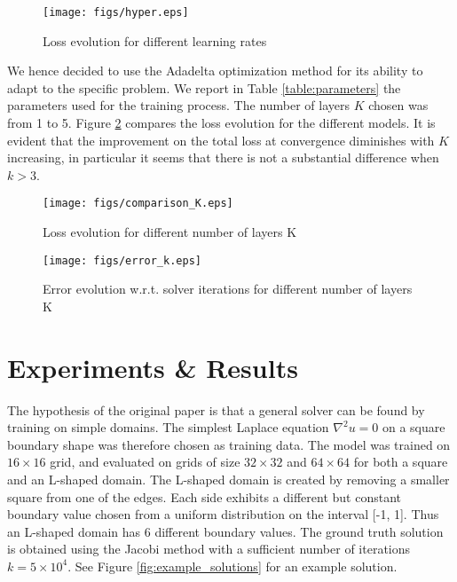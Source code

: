 \documentclass{article} %
\begin{document}


\begin{figure}[h]
\centering
\texttt{[image: figs/hyper.eps]}
\caption{Loss evolution for different learning rates}
\label{fig:hyperparam_learning_rate}
\end{figure}    

We hence decided to use the Adadelta optimization method for its ability to adapt to the specific problem. 
We report in Table \ref{table:parameters} the parameters used for the training process. The number of layers $K$ chosen was from 1 to 5. Figure \ref{fig:hyperparam_K} compares the loss evolution for the different models. It is evident that the improvement on the total loss at convergence diminishes with $K$ increasing, in particular it seems that there is not a substantial difference when $k>3$. 

\begin{figure}[h]
\centering
\texttt{[image: figs/comparison\_K.eps]}
\caption{Loss evolution for different number of layers K}
\label{fig:hyperparam_K}
\end{figure}

\begin{figure}[h]
\centering
\texttt{[image: figs/error\_k.eps]}
\caption{Error evolution w.r.t. solver iterations for different number of layers K}
\label{fig:error_K}
\end{figure}

\section{Experiments \& Results}

The hypothesis of the original paper is that a general solver can be found by training on simple domains. The simplest Laplace equation $\nabla^2u = 0$ on a square boundary shape was therefore chosen as training data.
The model was trained on $16\times16$ grid, and evaluated on grids of size $32\times32$ and $64\times64$ for both a square and an L-shaped domain. 
The L-shaped domain is created by removing a smaller square from one of the edges. Each side exhibits a different but constant boundary value chosen from a uniform distribution on the interval [-1, 1]. Thus an L-shaped domain has 6 different boundary values. The ground truth solution is obtained using the Jacobi method with a sufficient number of iterations $k=5\times10^4$. See Figure \ref{fig:example_solutions} for an example solution.
\end{document}
